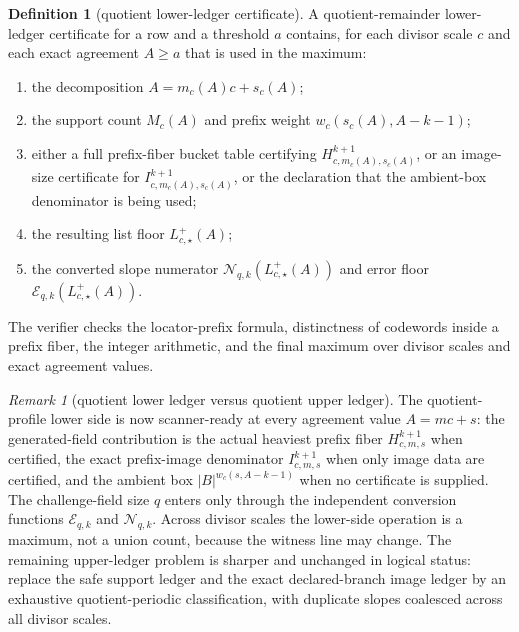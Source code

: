 \documentclass[11pt]{article}
\theoremstyle{definition}
\newtheorem{definition}[theorem]{Definition}
\theoremstyle{remark}
\newtheorem{remark}[theorem]{Remark}
\newcommand{\B}{B}
\begin{document}
\begin{definition}[quotient lower-ledger certificate]
\label{def:quotient-lower-ledger-certificate}
A quotient-remainder lower-ledger certificate for a row and a threshold $a$
contains, for each divisor scale $c$ and each exact agreement $A\ge a$ that is
used in the maximum:
\begin{enumerate}[label=\textup{(\roman*)},leftmargin=2.2em]
\item the decomposition $A=m_c(A)c+s_c(A)$;
\item the support count $M_c(A)$ and prefix weight $w_c(s_c(A),A-k-1)$;
\item either a full prefix-fiber bucket table certifying
$H_{c,m_c(A),s_c(A)}^{k+1}$, or an image-size certificate for
$I_{c,m_c(A),s_c(A)}^{k+1}$, or the declaration that the ambient-box denominator
is being used;
\item the resulting list floor $L_{c,\star}^+(A)$;
\item the converted slope numerator
$\mathcal N_{q,k}(L_{c,\star}^+(A))$ and error floor
$\mathcal E_{q,k}(L_{c,\star}^+(A))$.
\end{enumerate}
The verifier checks the locator-prefix formula, distinctness of codewords inside
a prefix fiber, the integer arithmetic, and the final maximum over divisor
scales and exact agreement values.
\end{definition}

\begin{remark}[quotient lower ledger versus quotient upper ledger]
\label{rem:T1-lower-ledger-status}
The quotient-profile lower side is now scanner-ready at every agreement value
$A=mc+s$: the generated-field contribution is the actual heaviest prefix fiber
$H_{c,m,s}^{k+1}$ when certified, the exact prefix-image denominator
$I_{c,m,s}^{k+1}$ when only image data are certified, and the ambient box
$|\B|^{w_c(s,A-k-1)}$ when no certificate is supplied.  The challenge-field size
$q$ enters only through the independent conversion functions
$\mathcal E_{q,k}$ and $\mathcal N_{q,k}$.  Across divisor scales the lower-side
operation is a maximum, not a union count, because the witness line may change.
The remaining upper-ledger problem is sharper and unchanged in logical status:
replace the safe support ledger and the exact declared-branch image ledger by an
exhaustive quotient-periodic classification, with duplicate slopes coalesced
across all divisor scales.
\end{remark}
\end{document}
